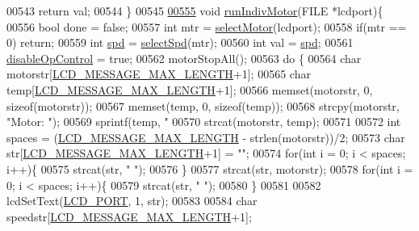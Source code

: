\begin{DoxyCode}
{{{{{{{{00543     \textcolor{keywordflow}{return} val;
00544 \}
00545 
\hypertarget{lcddiag_8c_source.tex_l00555}{}\hyperlink{lcddiag_8c_ad4df85d8b386f9a60b097fd65cf27e3b}{00555} \textcolor{keywordtype}{void} \hyperlink{lcddiag_8c_ad4df85d8b386f9a60b097fd65cf27e3b}{runIndivMotor}(FILE *lcdport)\{
00556     \textcolor{keywordtype}{bool} done = \textcolor{keyword}{false};
00557     \textcolor{keywordtype}{int} mtr = \hyperlink{lcddiag_8c_ae7425e4ec1454bd0054bd4e1db7ea686}{selectMotor}(lcdport);
00558     \textcolor{keywordflow}{if}(mtr == 0) \textcolor{keywordflow}{return};
00559     \textcolor{keywordtype}{int} \hyperlink{opcontrol_8c_a642ce334330c8b0f6e33dd0a3fa65111}{spd} = \hyperlink{lcddiag_8c_a1f4f4ecd7b0c166456dd26a66e51f813}{selectSpd}(mtr);
00560     \textcolor{keywordtype}{int} val = \hyperlink{opcontrol_8c_a642ce334330c8b0f6e33dd0a3fa65111}{spd};
00561     \hyperlink{lcddiag_8c_a0f0b335cd078d025d6fb720eb3bf6437}{disableOpControl} = \textcolor{keyword}{true};
00562     motorStopAll();
00563     \textcolor{keywordflow}{do} \{
00564         \textcolor{keywordtype}{char} motorstr[\hyperlink{lcdmsg_8h_abe4c4b70fc6f44ae3680e5b2c68cdd00}{LCD\_MESSAGE\_MAX\_LENGTH}+1];
00565         \textcolor{keywordtype}{char} temp[\hyperlink{lcdmsg_8h_abe4c4b70fc6f44ae3680e5b2c68cdd00}{LCD\_MESSAGE\_MAX\_LENGTH}+1];
00566         memset(motorstr, 0, \textcolor{keyword}{sizeof}(motorstr));
00567         memset(temp, 0, \textcolor{keyword}{sizeof}(temp));
00568         strcpy(motorstr, \textcolor{stringliteral}{"Motor: "});
00569         sprintf(temp, \textcolor{stringliteral}{"%
00570         strcat(motorstr, temp);
00571 
00572         \textcolor{keywordtype}{int} spaces = (\hyperlink{lcdmsg_8h_abe4c4b70fc6f44ae3680e5b2c68cdd00}{LCD\_MESSAGE\_MAX\_LENGTH} - strlen(motorstr))/2;
00573         \textcolor{keywordtype}{char} str[\hyperlink{lcdmsg_8h_abe4c4b70fc6f44ae3680e5b2c68cdd00}{LCD\_MESSAGE\_MAX\_LENGTH}+1] = \textcolor{stringliteral}{""};
00574         \textcolor{keywordflow}{for}(\textcolor{keywordtype}{int} i = 0; i < spaces; i++)\{
00575             strcat(str, \textcolor{stringliteral}{" "});
00576         \}
00577         strcat(str, motorstr);
00578         \textcolor{keywordflow}{for}(\textcolor{keywordtype}{int} i = 0; i < spaces; i++)\{
00579             strcat(str, \textcolor{stringliteral}{" "});
00580         \}
00581 
00582         lcdSetText(\hyperlink{lcdmsg_8h_abcf42bd88b3c36193f301ca25b033875}{LCD\_PORT}, 1, str);
00583 
00584         \textcolor{keywordtype}{char} speedstr[\hyperlink{lcdmsg_8h_abe4c4b70fc6f44ae3680e5b2c68cdd00}{LCD\_MESSAGE\_MAX\_LENGTH}+1];
}}}}}}}}}
\end{DoxyCode}
